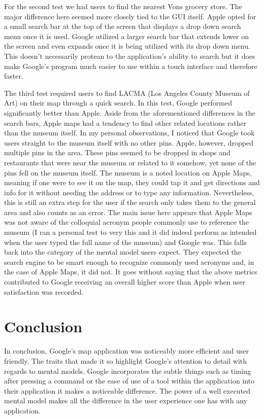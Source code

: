 \documentclass[12pt, oneside]{article}
\begin{document}
For the second test we had users to find the nearest Vons grocery store. The major difference here seemed more closely tied to the GUI itself. Apple opted for a small search bar at the top of the screen that displays a drop down search menu once it is used. Google utilized a larger search bar that extends lower on the screen and even expands once it is being utilized with its drop down menu. This doesn’t necessarily protean to  the application's ability to search but it does make Google's program much easier to use within a touch interface and therefore faster.

The third test required users to find LACMA (Los Angeles County Museum of Art) on their map through a quick search. In this test, Google performed significantly better than Apple. Aside from the aforementioned differences in the search bars, Apple maps had a tendency to find other related locations rather than the museum itself. In my personal observations, I noticed that Google took users straight to the museum itself with no other pins. Apple, however, dropped multiple pins in the area. These pins seemed to be dropped in shops and restaurants that were near the museum or related to it somehow, yet none of the pins fell on the museum itself. The museum is a noted location on Apple Maps, meaning if one were to see it on the map, they could tap it and get directions and info for it without needing the address or to type any information. Nevertheless, this is still an extra step for the user if the search only takes them to the general area and also counts as an error. The main issue here appears that Apple Maps was not aware of the colloquial acronym people commonly use to reference the museum (I ran a personal test to very this and it did indeed perform as intended when the user typed the full name of the museum) and Google was. This falls back into the category of the mental model users expect. They expected the search engine to be smart enough to recognize commonly used acronyms and, in the case of Apple Maps, it did not. It goes without saying that the above metrics contributed to Google receiving an overall higher score than Apple when user satisfaction was recorded. 

\section{Conclusion}
In conclusion, Google's map application was noticeably more efficient and user friendly. The traits that made it so highlight Google's attention to detail with regards to mental models. Google incorporates the subtle things such as timing after pressing a command or the ease of use of a tool within the application into their application it makes a noticeable difference. The power of a well executed mental model makes all the difference in the user experience one has with any application.
\end{document}
